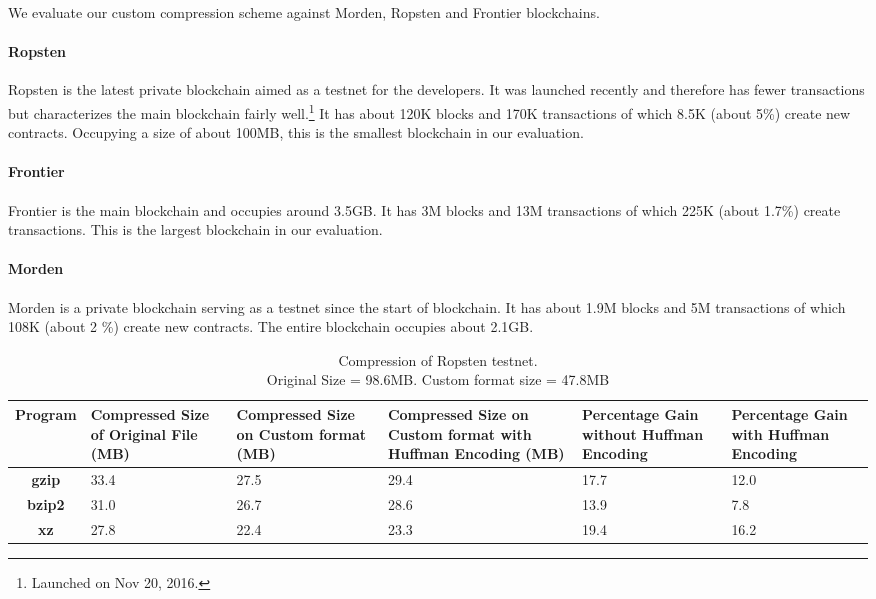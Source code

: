 

We evaluate our custom compression scheme against Morden, Ropsten and Frontier blockchains.
\paragraph{Ropsten}
Ropsten is the latest private blockchain aimed as a testnet for the \eth{} developers. It was launched recently and therefore has fewer transactions but characterizes the main blockchain fairly well.\footnote{Launched on Nov 20, 2016.}
It has about 120K blocks and 170K transactions of which 8.5K (about 5\%) create new contracts.
Occupying a size of about 100MB, this is the smallest blockchain in our evaluation. 
\paragraph{Frontier}
Frontier is the main \eth{} blockchain and occupies around 3.5GB. It has 3M blocks and 13M transactions of which 225K (about 1.7\%) create transactions. 
This is the largest blockchain in our evaluation.

\paragraph{Morden}
Morden is a private blockchain serving as a testnet since the start of \eth{} blockchain. 
It has about 1.9M blocks and 5M transactions of which 108K (about 2 \%) create new contracts. The entire blockchain occupies about 2.1GB.

\begin{table}[!b]
\centering
\captionsetup{justification=centering}
\begin{tabular}{ >{\bfseries}c| p{2cm} | p{2cm} |p{2cm} | p{1.5cm} | p{1.5cm} }
	Program & {Compressed Size of Original File (MB)} & {Compressed Size on Custom format (MB)} & {Compressed Size on Custom format with Huffman Encoding (MB)}& Percentage Gain without Huffman Encoding & Percentage Gain with Huffman Encoding\\
  \hline
  gzip  & 33.4 & 27.5 & 29.4 & 17.7 & 12.0 \\
  bzip2 & 31.0 & 26.7 & 28.6 & 13.9 & 7.8  \\
  xz   & 27.8 & 22.4 &  23.3 & 19.4 & 16.2 \\
\end{tabular}
\caption{Compression of Ropsten testnet. \\ Original Size = 98.6MB. Custom format size = 47.8MB}
\label{tab:compropsten}
\end{table}

